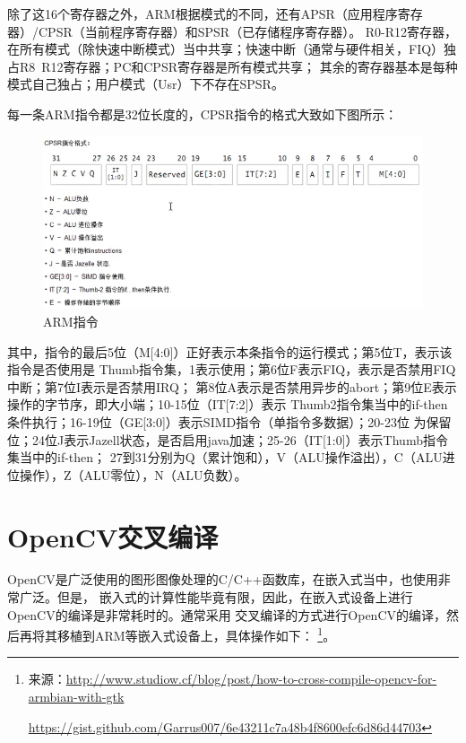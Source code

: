 除了这16个寄存器之外，ARM根据模式的不同，还有APSR（应用程序寄存器）/CPSR（当前程序寄存器）和SPSR（已存储程序寄存器）。
R0-R12寄存器，在所有模式（除快速中断模式）当中共享；快速中断（通常与硬件相关，FIQ）独占R8~R12寄存器；PC和CPSR寄存器是所有模式共享；
其余的寄存器基本是每种模式自己独占；用户模式（Usr）下不存在SPSR。

每一条ARM指令都是32位长度的，CPSR指令的格式大致如下图所示：
\begin{figure}[H]
  \centering
  \includegraphics[width=\linewidth]{arm_command.png}
  \caption{ARM指令}
  \label{fig:arm_command}
\end{figure}

其中，指令的最后5位（M[4:0]）正好表示本条指令的运行模式；第5位T，表示该指令是否使用是
Thumb指令集，1表示使用；第6位F表示FIQ，表示是否禁用FIQ中断；第7位I表示是否禁用IRQ；
第8位A表示是否禁用异步的abort；第9位E表示操作的字节序，即大小端；10-15位（IT[7:2]）表示
Thumb2指令集当中的if-then条件执行；16-19位（GE[3:0]）表示SIMD指令（单指令多数据）；20-23位
为保留位；24位J表示Jazell状态，是否启用java加速；25-26（IT[1:0]）表示Thumb指令集当中的if-then；
27到31分别为Q（累计饱和），V（ALU操作溢出），C（ALU进位操作），Z（ALU零位），N（ALU负数）。

\section{OpenCV交叉编译}
OpenCV是广泛使用的图形图像处理的C/C++函数库，在嵌入式当中，也使用非常广泛。但是，
嵌入式的计算性能毕竟有限，因此，在嵌入式设备上进行OpenCV的编译是非常耗时的。通常采用
交叉编译的方式进行OpenCV的编译，然后再将其移植到ARM等嵌入式设备上，具体操作如下：
\footnote{来源：\url{http://www.studiow.cf/blog/post/how-to-cross-compile-opencv-for-armbian-with-gtk}

\url{https://gist.github.com/Garrus007/6e43211c7a48b4f8600efc6d86d44703}}。

